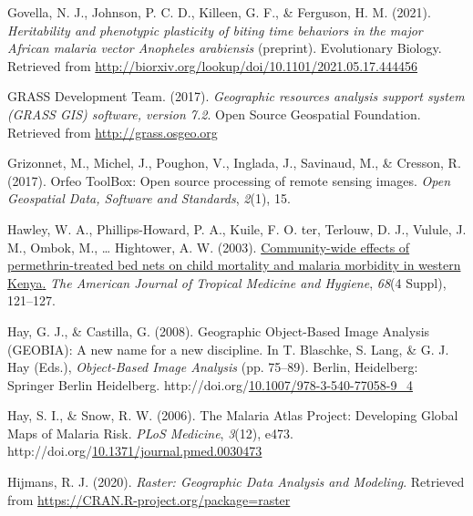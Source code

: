 \documentclass[12pt,twoside]{reedthesis}
\newlength{\cslhangindent}
\newenvironment{CSLReferences}[2] %
 {%
  \setlength{\parindent}{0pt}
  \ifodd #1 \everypar{\setlength{\hangindent}{\cslhangindent}}\ignorespaces\fi
  \ifnum #2 > 0
  \setlength{\parskip}{#2\baselineskip}
  \fi
 }%
 {}
\begin{document}
\begin{CSLReferences}{1}{0}
\leavevmode{}%
Govella, N. J., Johnson, P. C. D., Killeen, G. F., \& Ferguson, H. M. (2021). \emph{Heritability and phenotypic plasticity of biting time behaviors in the major {African} malaria vector \emph{{Anopheles} arabiensis}} (preprint). Evolutionary Biology. Retrieved from \url{http://biorxiv.org/lookup/doi/10.1101/2021.05.17.444456}

\leavevmode{}%
GRASS Development Team. (2017). \emph{Geographic resources analysis support system (GRASS GIS) software, version 7.2}. Open Source Geospatial Foundation. Retrieved from \url{http://grass.osgeo.org}

\leavevmode{}%
Grizonnet, M., Michel, J., Poughon, V., Inglada, J., Savinaud, M., \& Cresson, R. (2017). Orfeo ToolBox: Open source processing of remote sensing images. \emph{Open Geospatial Data, Software and Standards}, \emph{2}(1), 15.

\leavevmode{}%
Hawley, W. A., Phillips-Howard, P. A., Kuile, F. O. ter, Terlouw, D. J., Vulule, J. M., Ombok, M., \ldots{} Hightower, A. W. (2003). \href{https://www.ncbi.nlm.nih.gov/pubmed/12749495}{Community-wide effects of permethrin-treated bed nets on child mortality and malaria morbidity in western {Kenya}.} \emph{The American Journal of Tropical Medicine and Hygiene}, \emph{68}(4 Suppl), 121--127.

\leavevmode{}%
Hay, G. J., \& Castilla, G. (2008). Geographic {Object}-{Based} {Image} {Analysis} ({GEOBIA}): {A} new name for a new discipline. In T. Blaschke, S. Lang, \& G. J. Hay (Eds.), \emph{Object-{Based} {Image} {Analysis}} (pp. 75--89). Berlin, Heidelberg: Springer Berlin Heidelberg. http://doi.org/\href{https://doi.org/10.1007/978-3-540-77058-9_4}{10.1007/978-3-540-77058-9\_4}

\leavevmode{}%
Hay, S. I., \& Snow, R. W. (2006). The {Malaria} {Atlas} {Project}: {Developing} {Global} {Maps} of {Malaria} {Risk}. \emph{PLoS Medicine}, \emph{3}(12), e473. http://doi.org/\href{https://doi.org/10.1371/journal.pmed.0030473}{10.1371/journal.pmed.0030473}

\leavevmode{}%
Hijmans, R. J. (2020). \emph{Raster: {Geographic} {Data} {Analysis} and {Modeling}}. Retrieved from \url{https://CRAN.R-project.org/package=raster}


\end{CSLReferences}
\end{document}
